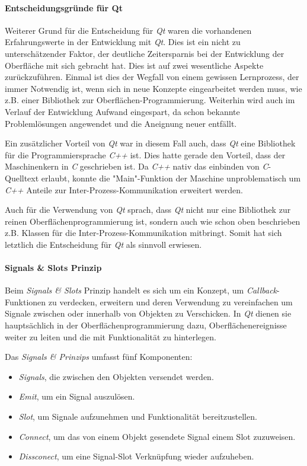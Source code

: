 \paragraph{Entscheidungsgründe für Qt}
Weiterer Grund für die Entscheidung für \emph{Qt} waren die vorhandenen Erfahrungswerte in der Entwicklung mit \emph{Qt}. Dies ist ein nicht zu unterschätzender Faktor, der deutliche Zeitersparnis bei der Entwicklung der Oberfläche mit sich gebracht hat. Dies ist auf zwei wesentliche Aspekte zurückzuführen. Einmal ist dies der Wegfall von einem gewissen Lernprozess, der immer Notwendig ist, wenn sich in neue Konzepte eingearbeitet werden muss, wie z.B. einer Bibliothek zur Oberflächen-Programmierung. Weiterhin wird auch im Verlauf der Entwicklung Aufwand eingespart, da schon bekannte Problemlösungen angewendet und die Aneignung neuer entfällt.

Ein zusätzlicher Vorteil von \emph{Qt} war in diesem Fall auch, dass \emph{Qt} eine Bibliothek für die Programmiersprache \emph{C++} ist. Dies hatte gerade den Vorteil, dass der Maschinenkern in \emph{C} geschrieben ist. Da \emph{C++} nativ das einbinden von \emph{C}-Quelltext erlaubt, konnte die "Main"-Funktion der Maschine unproblematisch um \emph{C++} Anteile zur Inter-Prozess-Kommunikation erweitert werden.

Auch für die Verwendung von \emph{Qt} sprach, dass \emph{Qt} nicht nur eine Bibliothek zur reinen Oberflächenprogrammierung ist, sondern auch wie schon oben beschrieben z.B. Klassen für die Inter-Prozess-Kommunikation mitbringt. Somit hat sich letztlich die Entscheidung für \emph{Qt} als sinnvoll erwiesen.

\paragraph{Signals \& Slots Prinzip}
Beim \emph{Signals \& Slots} Prinzip handelt es sich um ein Konzept, um \emph{Callback}-Funktionen zu verdecken, erweitern und deren Verwendung zu vereinfachen um Signale zwischen oder innerhalb von Objekten zu Verschicken. In \emph{Qt} dienen sie hauptsächlich in der Oberflächenprogrammierung dazu, Oberflächenereignisse weiter zu leiten und die mit Funktionalität zu hinterlegen.

Das \emph{Signals \& Prinzips }umfasst fünf Komponenten:
\begin{itemize}
\item \emph{Signals}, die zwischen den Objekten versendet werden.
\item \emph{Emit}, um ein Signal auszulösen.
\item \emph{Slot}, um Signale aufzunehmen und Funktionalität bereitzustellen.
\item \emph{Connect}, um das von einem Objekt gesendete Signal einem Slot zuzuweisen.
\item \emph{Dissconect}, um eine Signal-Slot Verknüpfung wieder aufzuheben.
\end{itemize}

